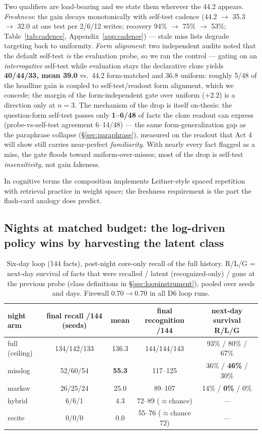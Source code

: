 \documentclass[11pt]{article}
\begin{document}
Two qualifiers are load-bearing and we state them wherever the 44.2 appears. \emph{Freshness}:
the gain decays monotonically with self-test cadence (44.2 $\to$ 35.3 $\to$ 32.0 at one test per
2/6/12 writes; recovery 94\% $\to$ 75\% $\to$ 53\%; Table~\ref{tab:cadence},
Appendix~\ref{app:cadence}) ---
stale miss lists degrade targeting back to uniformity. \emph{Form alignment}: two independent
audits noted that the default self-test \emph{is} the evaluation probe, so we ran the control ---
gating on an \emph{interrogative} self-test while evaluation stays the declarative cloze yields
\textbf{40/44/33, mean 39.0} vs.\ 44.2 form-matched and 36.8 uniform: roughly 5/48 of the
headline gain is coupled to self-test/readout form alignment, which we concede; the margin of
the form-independent gate over uniform ($+2.2$) is a direction only at $n{=}3$. The mechanism of
the drop is itself on-thesis: the question-form self-test passes only \textbf{1--6/48} of facts
the cloze readout can express (probe-vs-self-test agreement 6--14/48) --- the same
form-generalization gap as the paraphrase collapse (\S\ref{sec:paraphrase}), measured on the
readout that Act 4 will show still carries near-perfect \emph{familiarity}. With nearly every
fact flagged as a miss, the gate floods toward uniform-over-misses; most of the drop is
self-test \emph{insensitivity}, not gain fakeness.

In cognitive terms the composition implements Leitner-style spaced repetition with retrieval
practice \citep{roediger2006} in weight space; the freshness requirement is the part the
flash-card analogy does predict.

\subsection{Nights at matched budget: the log-driven policy wins by harvesting the latent class}
\label{sec:policies}

\begin{table}[t]\centering\small
\begin{tabular}{lcccc}
\toprule
night arm & final recall /144 (seeds) & mean & final recognition /144 & next-day survival R/L/G \\
\midrule
full (ceiling) & 134/142/133 & 136.3 & 144/144/143 & 93\% / 80\% / 67\% \\
misslog        & 52/60/54    & \textbf{55.3} & 117--125 & 36\% / \textbf{46\%} / 30\% \\
markov         & 26/25/24    & 25.0  & 89--107  & 14\% / \textbf{0\%} / 0\% \\
hybrid         & 6/6/1       & 4.3   & 72--89 ($\approx$chance) & --- \\
recite         & 0/0/0       & 0.0   & 55--76 ($\approx$chance 72) & --- \\
\bottomrule
\end{tabular}
\caption{Six-day loop (144 facts), post-night core-only recall of the full history. R/L/G =
next-day survival of facts that were recalled / latent (recognized-only) / gone at the previous
probe (class definitions in \S\ref{sec:loopinstrument}), pooled over seeds and days. Firewall
$0.70\to0.70$ in all D6 loop runs.}
\label{tab:d6}
\end{table}
\end{document}
